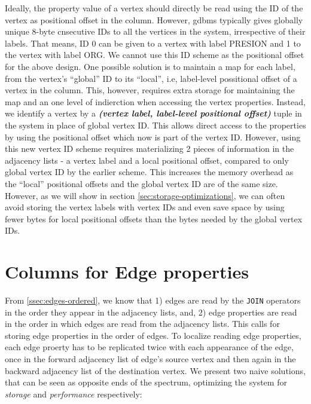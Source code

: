 Ideally, the property value of a vertex should directly be read using the ID of the vertex as positional offset in the column. However, \gls{gdbms} typically gives globally unique 8-byte cnsecutive IDs to all the vertices in the system, irrespective of their labels. That means, ID 0 can be given to a vertex with label PRESION and 1 to the vertex with label ORG. We cannot use this ID scheme as the positional offset for the above design. One possible solution is to maintain a map for each label, from the vertex's \enquote{global} ID to its \enquote{local}, i.e, label-level possitional offset of a vertex in the column. This, however, requires extra storage for maintaining the map and an one level of indierction when accessing the vertex properties. Instead, we identify a vertex by a \emph{\textbf{(vertex label, label-level positional offset)}} tuple in the system in place of global vertex ID. This allows direct access to the properties by using the positional offset which now is part of the vertex ID. However, using this new vertex ID scheme requires materializing 2 pieces of information in the adjacency lists - a vertex label and a local positional offset, compared to only global vertex ID by the earlier scheme. This increases the memory overhead as the \enquote{local} positional offsets and the global vertex ID are of the same size. However, as we will show in section \ref{sec:storage-optimizations}, we can often avoid storing the vertex labels with vertex IDs and even save space by using fewer bytes for local positional offsets than the bytes needed by the global vertex IDs.



\section{Columns for Edge properties}
\label{sec:edge-property-columns}

From \ref{ssec:edges-ordered}, we know that 1) edges are read by the \texttt{JOIN} operators in the order they appear in the adjacency lists, and, 2) edge properties are read in the order in which edges are read from the adjacency lists. This calls for storing edge properties in the order of edges. To localize reading edge properties, each edge proerty has to be replicated twice with each appearance of the edge, once in the forward adjacency list of edge's source vertex and then again in the backward adjacency list of the destination vertex. We present two naive solutions, that can be seen as opposite ends of the spectrum, optimizing the system for \emph{storage} and \emph{performance} respectively:

